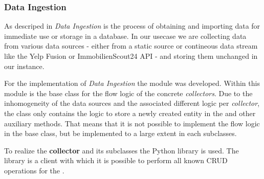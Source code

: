\subsubsection{Data Ingestion}
\label{subsubsec:ingestion}
As descriped in\cite{ingestion} \textit{Data Ingestion} is the process of obtaining and importing data for immediate use or storage in a database.
In our usecase we are collecting data from various data sources - either from a static source or contineous data stream like the Yelp Fusion or ImmobilienScout24 \ac{API} - and storing them unchanged in our \gds{} instance.

For the implementation of \textit{Data Ingestion} the  module was developed.
Within this module is the base class for the flow logic of the concrete \textit{collectors}.
Due to the inhomogeneity of the data sources and the associated different logic per \textit{collector}, the  class only contains the logic
to store a newly created entity in the \gds{} and other auxiliary methods.
That means that it is not possible to implement the flow logic in the base class, but be implemented to a large extent in each subclasses.

To realize the \textbf{collector} and its subclasses the Python library  is used.
The library  is a client with which it is possible to perform all known \ac{CRUD} operations for the \gds{}.
